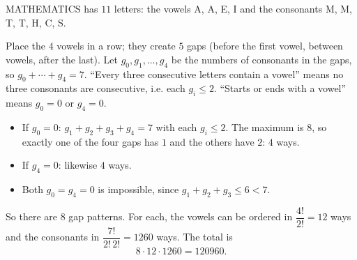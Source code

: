 MATHEMATICS has $11$ letters: the vowels A, A, E, I and the consonants M, M, T, T, H, C, S.

Place the $4$ vowels in a row; they create $5$ gaps (before the first vowel, between vowels, after the last). Let $g_0,g_1,\dots,g_4$ be the numbers of consonants in the gaps, so $g_0+\cdots+g_4=7$. ``Every three consecutive letters contain a vowel'' means no three consonants are consecutive, i.e. each $g_i\le2$. ``Starts or ends with a vowel'' means $g_0=0$ or $g_4=0$.
\begin{itemize}
\item If $g_0=0$: $g_1+g_2+g_3+g_4=7$ with each $g_i\le2$. The maximum is $8$, so exactly one of the four gaps has $1$ and the others have $2$: $4$ ways.
\item If $g_4=0$: likewise $4$ ways.
\item Both $g_0=g_4=0$ is impossible, since $g_1+g_2+g_3\le6<7$.
\end{itemize}
So there are $8$ gap patterns. For each, the vowels can be ordered in $\dfrac{4!}{2!}=12$ ways and the consonants in $\dfrac{7!}{2!\,2!}=1260$ ways. The total is
\[
8\cdot12\cdot1260=\boxed{120960} .
\]
